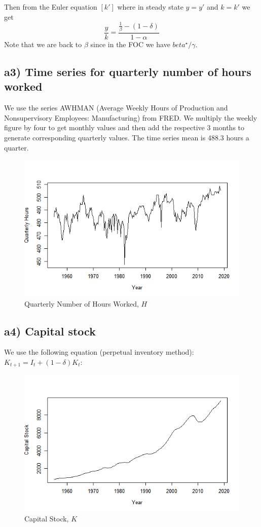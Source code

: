 \documentclass[10pt,letter]{article}
\begin{document}
Then from the Euler equation $[k']$  where in steady state $y=y'$ and $k=k'$ we get
$$\frac{y}{k} = \frac{\frac{1}{\beta}- (1-\delta)}{1-\alpha}$$
Note that we are back to $\beta$ since in the FOC we have $beta^\star/\gamma  $.

\subsection*{a3) Time series for quarterly number of hours worked}
We use the series AWHMAN (Average Weekly Hours of Production and Nonsupervisory Employees: Manufacturing) from FRED. We multiply the weekly figure by four to get monthly values and then add the respective 3 months to generate corresponding quarterly values. The time series mean is 488.3 hours a quarter.

	\begin{figure}[H]
		\centering
		\includegraphics[width=1\linewidth]{A2_Hours.png}
		\caption{Quarterly Number of Hours Worked, $H$}
		\label{fig:QuarterlyHours}
	\end{figure} 

\subsection*{a4) Capital stock}

We use the following equation (perpetual inventory method): $K_{t+1}=I_t+(1-\delta)K_t$:

	\begin{figure}[H]
	\centering
	\includegraphics[width=1\linewidth]{A4_CapStock.png}
	\caption{Capital Stock, $K$}
	\label{fig:CapStock}
\end{figure} 
\end{document}
